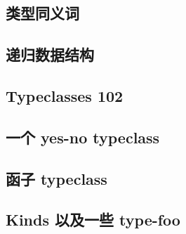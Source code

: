\documentclass[./main.tex]{subfiles}
\begin{document}

\subsection*{类型同义词}


\subsection*{递归数据结构}


\subsection*{Typeclasses 102}


\subsection*{一个 yes-no typeclass}


\subsection*{函子 typeclass}


\subsection*{Kinds 以及一些 type-foo}

\end{document}

